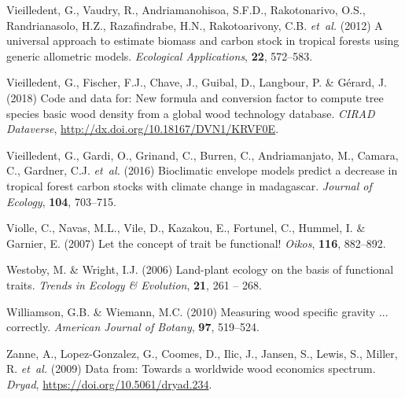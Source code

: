 \documentclass[a4paper, 12pt, leqno, dvipsnames]{article}\usepackage[]{graphicx}\usepackage[]{color}
\begin{document}
\begin{thebibliography}{50}
Vieilledent, G., Vaudry, R., Andriamanohisoa, S.F.D., Rakotonarivo, O.S.,
  Randrianasolo, H.Z., Razafindrabe, H.N., Rakotoarivony, C.B. \emph{et~al.} (2012) A universal approach to estimate biomass and carbon
  stock in tropical forests using generic allometric models.
\newblock \emph{Ecological Applications}, \textbf{22}, 572--583.

Vieilledent, G., Fischer, F.J., Chave, J., Guibal, D., Langbour, P. \& Gérard,
  J. (2018) {Code and data for: New formula and conversion factor to compute
  tree species basic wood density from a global wood technology database.
  \emph{CIRAD Dataverse}, \url{http://dx.doi.org/10.18167/DVN1/KRVF0E}}.

Vieilledent, G., Gardi, O., Grinand, C., Burren, C., Andriamanjato, M., Camara,
  C., Gardner, C.J. \emph{et~al.} (2016) Bioclimatic envelope models predict a decrease
  in tropical forest carbon stocks with climate change in madagascar.
\newblock \emph{Journal of Ecology}, \textbf{104}, 703--715.

Violle, C., Navas, M.L., Vile, D., Kazakou, E., Fortunel, C., Hummel, I. \&
  Garnier, E. (2007) Let the concept of trait be functional!
\newblock \emph{Oikos}, \textbf{116}, 882--892.

Westoby, M. \& Wright, I.J. (2006) Land-plant ecology on the basis of
  functional traits.
\newblock \emph{Trends in Ecology \& Evolution}, \textbf{21}, 261 -- 268.

Williamson, G.B. \& Wiemann, M.C. (2010) Measuring wood specific gravity ...
  correctly.
\newblock \emph{American Journal of Botany}, \textbf{97}, 519--524.

Zanne, A., Lopez-Gonzalez, G., Coomes, D., Ilic, J., Jansen, S., Lewis, S.,
  Miller, R. \emph{et~al.} (2009) {Data from: Towards
  a worldwide wood economics spectrum. \emph{Dryad},
  \url{https://doi.org/10.5061/dryad.234}}.

\end{thebibliography}

\newpage
\end{document}

